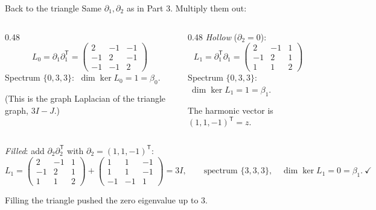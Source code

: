 \documentclass[10pt,aspectratio=169]{beamer}
\begin{document}
    \begin{frame}[shrink=12]{Back to the triangle}
        Same $\partial_1,\partial_2$ as in Part 3. Multiply them out:

        \vspace{0.4em}
        \begin{columns}[T,onlytextwidth]
            \begin{column}{0.48\textwidth}
                \small
                \[
                    L_0=\partial_1\partial_1^{\mathsf T}=
                    \begin{pmatrix}
                        2&-1&-1\\ -1&2&-1\\ -1&-1&2
                    \end{pmatrix}
                \]
                Spectrum $\{0,3,3\}$: $\ \dim\ker L_0=1=\beta_0$. \checkmark

                \vspace{0.3em}
                {\scriptsize (This is the graph Laplacian of the triangle graph, $3I-J$.)}
            \end{column}
            \begin{column}{0.48\textwidth}
                \small
                \emph{Hollow} ($\partial_2=0$):
                \[
                    L_1=\partial_1^{\mathsf T}\partial_1=
                    \begin{pmatrix}
                        2&-1&1\\ -1&2&1\\ 1&1&2
                    \end{pmatrix}
                \]
                Spectrum $\{0,3,3\}$: $\ \dim\ker L_1=1=\beta_1$. \checkmark

                The harmonic vector is $(1,1,-1)^{\mathsf T}=z$.
            \end{column}
        \end{columns}

        \vspace{0.6em}

        \emph{Filled}: add $\partial_2\partial_2^{\mathsf T}$ with $\partial_2=(1,1,-1)^{\mathsf T}$:
        \[
            L_1=\begin{pmatrix}
                    2&-1&1\\ -1&2&1\\ 1&1&2
            \end{pmatrix}
            +\begin{pmatrix}
                 1&1&-1\\ 1&1&-1\\ -1&-1&1
            \end{pmatrix}
            =3I,
            \qquad \text{spectrum }\{3,3,3\},\quad \dim\ker L_1=0=\beta_1 . \ \checkmark
        \]
        \begin{center}
            \alert{Filling the triangle pushed the zero eigenvalue up to $3$.}
        \end{center}
    \end{frame}
\end{document}
